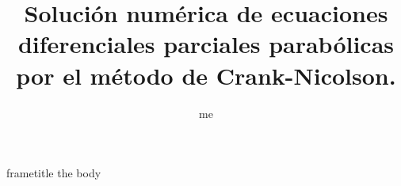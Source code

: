 \documentclass{beamer}
\title{Solución numérica de ecuaciones diferenciales parciales parabólicas por el método de Crank-Nicolson.}
\author{me}
\begin{document}
\begin{frame}
	\titlepage
\end{frame}

\begin{frame}{frametitle}
	the body
\end{frame}
\end{document}
